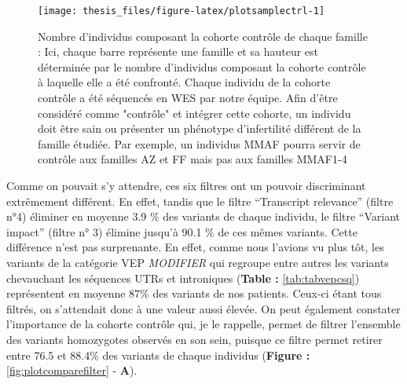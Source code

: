 \documentclass[12pt,twoside]{reedthesis}
\theoremstyle{definition}
\theoremstyle{definition}
\theoremstyle{remark}
\begin{document}
  \newpage
  
  \begin{figure}
  
  {\centering \texttt{[image: thesis\_files/figure-latex/plotsamplectrl-1]} 
  
  }
  
  \caption[Nombre d'individus composant la cohorte contrôle de chaque famille]{Nombre d'individus composant la cohorte contrôle de chaque famille : Ici, chaque barre représente une famille et sa hauteur est déterminée par le nombre d'individus composant la cohorte contrôle à laquelle elle a été confronté. Chaque individu de la cohorte contrôle a été séquencés en WES par notre équipe. Afin d'être considéré comme "contrôle" et intégrer cette cohorte, un individu doit être sain ou présenter un phénotype d'infertilité différent de la famille étudiée. Par exemple, un individus MMAF pourra servir de contrôle aux familles AZ et FF mais pas aux familles MMAF1-4}\label{fig:plotsamplectrl}
  \end{figure}
  
  \newpage
  
  Comme on pouvait s'y attendre, ces six filtres ont un pouvoir
  discriminant extrêmement différent. En effet, tandis que le filtre
  ``Transcript relevance'' (filtre n°4) éliminer en moyenne 3.9 \% des
  variants de chaque individu, le filtre ``Variant impact'' (filtre n° 3)
  élimine jusqu'à 90.1 \% de ces mêmes variants. Cette différence n'est
  pas surprenante. En effet, comme nous l'avions vu plus tôt, les variants
  de la catégorie VEP \emph{MODIFIER} qui regroupe entre autres les
  variants chevauchant les séquences UTRs et introniques (\textbf{Table :}
  \ref{tab:tabvepcsq}) représentent en moyenne 87\% des variants de nos
  patients. Ceux-ci étant tous filtrés, on s'attendait donc à une valeur
  aussi élevée. On peut également constater l'importance de la cohorte
  contrôle qui, je le rappelle, permet de filtrer l'ensemble des variants
  homozygotes observés en son sein, puisque ce filtre permet retirer entre
  76.5 et 88.4\% des variants de chaque individus (\textbf{Figure :}
  \ref{fig:plotcomparefilter} - \textbf{A}).
  
\end{document}

